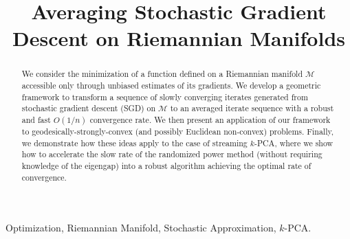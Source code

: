 \documentclass[final,12pt]{colt2018} %
\title[Averaging on Manifolds]{Averaging Stochastic Gradient Descent on Riemannian Manifolds}
\begin{document}
\maketitle
\vspace*{-.35cm}
\begin{abstract}
We consider the minimization of a function defined on a Riemannian manifold $\mathcal{M}$ accessible only through unbiased estimates of its gradients. We develop a geometric framework to transform a sequence of slowly converging iterates generated from stochastic gradient descent (SGD) on $\mathcal{M}$ to an averaged iterate sequence with a robust and fast $O(1/n)$ convergence rate. We then present an application of our framework to geodesically-strongly-convex (and possibly Euclidean non-convex) problems.  Finally, we demonstrate how these ideas apply to the case of streaming $k$-PCA, where we show how to accelerate the slow rate of the randomized power method  (without requiring knowledge of the eigengap) into a robust algorithm achieving the optimal rate of convergence.
\end{abstract}

\begin{keywords}
Optimization, Riemannian Manifold, Stochastic Approximation, $k$-PCA.
\end{keywords}












\newpage
\onecolumn
\appendix






\end{document}
